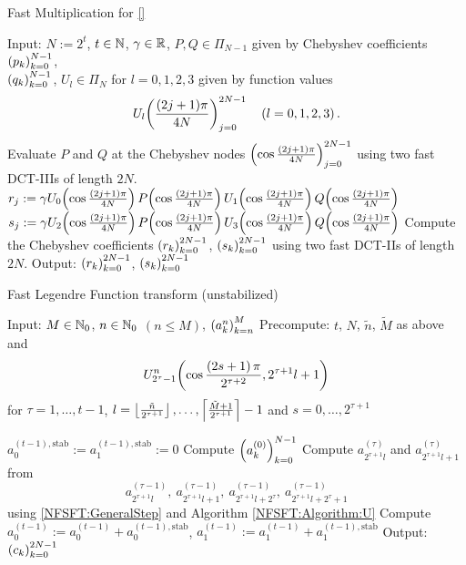 \begin{algorithm}[htb]
  \caption{Fast Multiplication for \eqref{}}
  \label{NFSFT:Algorithm:U}
  \begin{algorithmic}
    \STATE Input:  $N := 2^t$, $t \in \mathbb{N}$, $\gamma \in \mathbb{R}$, $P,Q \in \Pi_{N-1}$ given by
       Chebyshev coefficients $\left(p_{k}\right)_{k=0}^{N-1}$,\\
    \STATE {} $\left(q_{k}\right)_{k=0}^{N-1}$, $U_{l} \in \Pi_{N}$ for $l=0,1,2,3$ 
      given by function values
      \[U_{l}{\hspace{-0.4ex}}\left(\frac{(2j+1)\pi}{4N}\right)_{j = 0}^{2N-1} \quad \left(l=0,1,2,3\right).\] 
    \STATE Evaluate $P$ and $Q$ at the Chebyshev nodes $\left(\cos \frac{(2j+1)\pi}{4N}\right)_{j = 0}^{2N-1}$
      using two fast DCT-IIIs of length $2N$.
    \STATE 
      \STATE $r_{j} := \gamma U_{0}{\hspace{-0.4ex}}\left(\cos \frac{(2j+1)\pi}{4N}\right) P{\hspace{-0.4ex}}\left(\cos \frac{(2j+1)\pi}{4N}\right)
        U_{1}{\hspace{-0.4ex}}\left(\cos \frac{(2j+1)\pi}{4N}\right) Q{\hspace{-0.4ex}}\left(\cos \frac{(2j+1)\pi}{4N}\right)$
      \STATE $s_{j} := \gamma U_{2}{\hspace{-0.4ex}}\left(\cos \frac{(2j+1)\pi}{4N}\right) P{\hspace{-0.4ex}}\left(\cos \frac{(2j+1)\pi}{4N}\right)
        U_{3}{\hspace{-0.4ex}}\left(\cos \frac{(2j+1)\pi}{4N}\right) Q{\hspace{-0.4ex}}\left(\cos \frac{(2j+1)\pi}{4N}\right)$
    \ENDFOR
    \STATE
    \STATE Compute the Chebyshev coefficients $\left(r_{k}\right)_{k=0}^{2N-1}$, $\left(s_{k}\right)_{k=0}^{2N-1}$ 
      using two fast DCT-IIs of length $2N$.
    \STATE
    \STATE Output: $\left(r_{k}\right)_{k=0}^{2N-1}$, $\left(s_{k}\right)_{k=0}^{2N-1}$
  \end{algorithmic}
\end{algorithm}  

\begin{algorithm}[htb]
  \caption{Fast Legendre Function transform (unstabilized)}
  \label{NFSFT:Algorithm:FLFT_unstab}    
  \begin{algorithmic}
    \STATE Input:  $M \in \mathbb{N}_{0}$, $n \in \mathbb{N}_{0}$ $(n \le M)$, $\left(a_k^n\right)_{k=n}^{M}$
    \STATE Precompute: $t$, $N$, $\tilde{n}$, $\tilde{M}$ as above and \[U_{2^{\tau}-1}^{n}{\hspace{-0.4ex}}\left(\cos \frac{\left(2s+1\right)\pi}{2^{\tau+2}}, 2^{\tau+1}l+1\right)\] 
    \STATE {} for $\tau = 1,\ldots,t-1$, $l = \left\lfloor\frac{\tilde{n}}{2^{\tau+1}}\right\rfloor,\ldots,\left\lceil\frac{\tilde{M}+1}{2^{\tau+1}}\right\rceil-1$ and $s = 0,\ldots,2^{\tau+1}$
    \STATE {} 

    \STATE $a_{0}^{(t-1),\text{stab}} := a_{1}^{(t-1),\text{stab}} := 0$
    \STATE Compute $\left(a_{k}^{(0)}\right)_{k=0}^{N-1}$ 
        \STATE Compute $a_{2^{\tau+1}l}^{(\tau)}$ and $a_{2^{\tau+1}l+1}^{(\tau)}$ from \[a_{2^{\tau+1}l}^{(\tau-1)},\  
          a_{2^{\tau+1}l+1}^{(\tau-1)},\ a_{2^{\tau+1}l+2^{\tau}}^{(\tau-1)},\ a_{2^{\tau+1}l+2^{\tau}+1}^{(\tau-1)}\] using 
          \eqref{NFSFT:GeneralStep} and Algorithm \ref{NFSFT:Algorithm:U}
      \ENDFOR
    \ENDFOR
    \STATE Compute $a_{0}^{(t-1)} := a_{0}^{(t-1)} + a_{0}^{(t-1),\text{stab}}$, $a_{1}^{(t-1)} := a_{1}^{(t-1)} + a_{1}^{(t-1),\text{stab}}$
    \STATE Output: $\left(c_{k}\right)_{k=0}^{2N-1}$
\end{algorithmic}
\end{algorithm}

